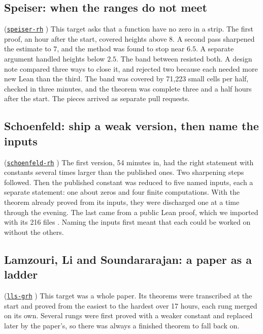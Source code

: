 \documentclass[11pt]{amsart}
\newcommand{\repo}[1]{\href{https://github.com/senamakel/#1}{\texttt{#1}}}
\begin{document}
\subsection*{Speiser: when the ranges do not meet} \textup{(\repo{speiser-rh} \cite{r-speiser-rh})} This target asks that a function have no zero in a strip. The first proof, an hour after the start, covered heights above $8$. A second pass sharpened the estimate to $7$, and the method was found to stop near $6.5$. A separate argument handled heights below $2.5$. The band between resisted both. A design note compared three ways to close it, and rejected two because each needed more new Lean than the third. The band was covered by 71{,}223 small cells per half, checked in three minutes, and the theorem was complete three and a half hours after the start. The pieces arrived as separate pull requests.

\subsection*{Schoenfeld: ship a weak version, then name the inputs} \textup{(\repo{schoenfeld-rh} \cite{r-schoenfeld-rh})} The first version, 54 minutes in, had the right statement with constants several times larger than the published ones. Two sharpening steps followed. Then the published constant was reduced to five named inputs, each a separate statement: one about zeros and four finite computations. With the theorem already proved from its inputs, they were discharged one at a time through the evening. The last came from a public Lean proof, which we imported with its 216 files \cite{rsbounds,ternary,zetalab}. Naming the inputs first meant that each could be worked on without the others.

\subsection*{Lamzouri, Li and Soundararajan: a paper as a ladder} \textup{(\repo{lls-grh} \cite{r-lls-grh})} This target was a whole paper. Its theorems were transcribed at the start and proved from the easiest to the hardest over 17 hours, each rung merged on its own. Several rungs were first proved with a weaker constant and replaced later by the paper's, so there was always a finished theorem to fall back on.
\end{document}
